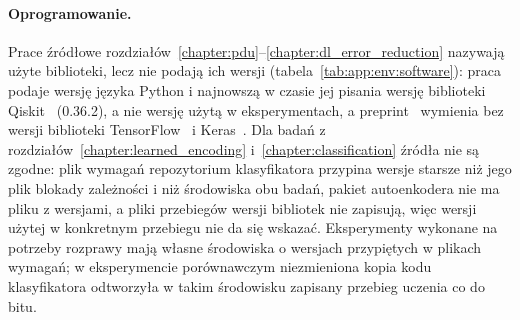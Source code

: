 \paragraph{Oprogramowanie.}
Prace źródłowe rozdziałów~\ref{chapter:pdu}--\ref{chapter:dl_error_reduction} nazywają użyte biblioteki, lecz nie podają ich wersji (tabela~\ref{tab:app:env:software}): praca~\cite{werner_magisterka_2022} podaje wersję języka Python i najnowszą w czasie jej pisania wersję biblioteki Qiskit~\cite{Qiskit} (0.36.2), a nie wersję użytą w eksperymentach, a preprint~\cite{werner_deep_learning_manuscript} wymienia bez wersji biblioteki TensorFlow~\cite{tensorflow2015-whitepaper} i Keras~\cite{chollet2015keras}.
Dla badań z rozdziałów~\ref{chapter:learned_encoding} i~\ref{chapter:classification} źródła nie są zgodne: plik wymagań repozytorium klasyfikatora przypina wersje starsze niż jego plik blokady zależności i niż środowiska obu badań, pakiet autoenkodera nie ma pliku z wersjami, a pliki przebiegów wersji bibliotek nie zapisują, więc wersji użytej w konkretnym przebiegu nie da się wskazać.
Eksperymenty wykonane na potrzeby rozprawy mają własne środowiska o wersjach przypiętych w plikach wymagań; w eksperymencie porównawczym niezmieniona kopia kodu klasyfikatora odtworzyła w takim środowisku zapisany przebieg uczenia co do bitu.

